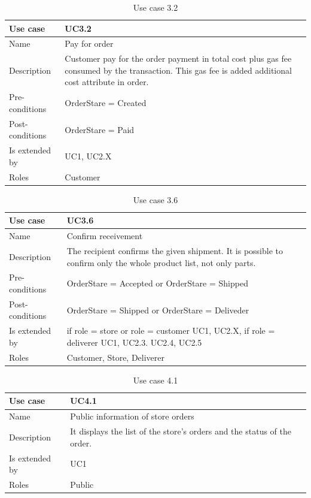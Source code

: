 \documentclass[thesis=M,english]{FITthesis}[2019/12/23]
\begin{document}
\begin{table}[ht!]
\caption{Use case 3.2} \label{useCase3.2}
\begin{tabular}{| p{3cm} | p{10cm}|}
\hline
Use case & UC3.2    \\\hline
Name     & Pay for order \\\hline
Description    & Customer pay for the order payment in total cost plus gas fee consumed by the transaction. This gas fee is added additional cost attribute in order.  \\\hline
Pre-conditions    & OrderStare = Created \\\hline
Post-conditions    & OrderStare = Paid \\\hline
Is extended by    & UC1, UC2.X \\\hline
Roles    & Customer \\\hline
\end{tabular}
\end{table}

\begin{table}[ht!]
\caption{Use case 3.6} \label{useCase3.6}
\begin{tabular}{| p{3cm} | p{10cm}|}
\hline
Use case & UC3.6    \\\hline
Name     & Confirm receivement \\\hline
Description    & The recipient confirms the given shipment. It is possible to confirm only the whole product list, not only parts.  \\\hline
Pre-conditions    & OrderStare = Accepted or OrderStare = Shipped \\\hline
Post-conditions    & OrderStare = Shipped or OrderStare = Deliveder \\\hline
Is extended by    & if role = store or role = customer UC1, UC2.X, if role = deliverer UC1, UC2.3. UC2.4, UC2.5 \\\hline
Roles    & Customer, Store, Deliverer \\\hline
\end{tabular}
\end{table}

\begin{table}[ht!]
\caption{Use case 4.1} \label{useCase4.1}
\begin{tabular}{| p{3cm} | p{10cm}|}
\hline
Use case & UC4.1    \\\hline
Name     & Public information of store orders \\\hline
Description    & It displays the list of the store's orders and the status of the order.   \\\hline
Is extended by    & UC1 \\\hline
Roles    & Public \\\hline
\end{tabular}
\end{table}
\end{document}
